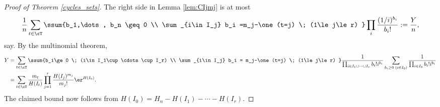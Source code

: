 \begin{proof}[Proof of Theorem \ref{cycles_sets}]
The right side in Lemma \ref{lem:CIjmj} is at most
 \[
 \frac{1}{n} \sum_{t\in \cT}
  \ssum{b_1,\dots, b_n \geq 0 \\ \sum_{i\in I_j} b_i =m_j-\one(t=j) \; (1\le j\le r)  } \prod_i \frac{(1/i)^{b_i}}{b_i!} := \frac{Y}{n},
\]
  say.   By the multinomial theorem,
  \begin{align*}
 Y & =    \sum_{t\in \cT} \ssum{b_i\ge 0 \; (i\in I_1\cup \cdots \cup I_r) \\ \sum_{i\in I_j} b_i = m_j-\one(t=j) \; (1\le j\le r) } 
  \frac{1}{\prod_{i\in I_1\cup \cdots \cup I_r} b_i! i^{b_i}} \sum_{b_i\ge 0 \; (i\in I_0)} \frac1{\prod_{i\in I_0} b_i! i^{b_i}}\\
  &=  \sum_{t\in \cT} \frac{m_t}{H(I_t)}\prod_{j=1}^r \frac{H(I_j)^{m_j}}{m_j!} \er^{H(I_0)}.
\end{align*}
 The claimed bound now follows from
$H(I_0) = H_n - H(I_1)-\cdots-H(I_r)$.
\end{proof}
